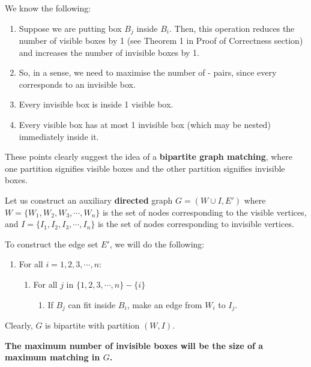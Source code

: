 \documentclass{article}
\begin{document}
We know the following:

\begin{enumerate}
    \item Suppose we are putting box $B_j$ inside $B_i$. Then, this operation reduces the number of visible boxes by 1 (see Theorem 1 in Proof of Correctness section) and increases the number of invisible boxes by 1.

    \item So, in a sense, we need to maximise the number of - pairs, since every  corresponds to an invisible box.

    \item Every invisible box is inside 1 visible box.

    \item Every visible box has at most 1 invisible box (which may be nested) immediately inside it.
\end{enumerate}

These points clearly suggest the idea of a \textbf{bipartite graph matching}, where one partition signifies visible boxes and the other partition signifies invisible boxes.

Let us construct an auxiliary \textbf{directed} graph $G = (W \cup I, E')$ where $W = \{W_1,W_2,W_3,\cdots,W_n\}$ is the set of nodes corresponding to the visible vertices, and $I = \{I_1, I_2, I_3, \cdots, I_n\}$ is the set of nodes corresponding to invisible vertices.

To construct the edge set $E'$, we will do the following:

\begin{enumerate}
    \item For all $i = 1,2,3, \cdots, n$:
        \begin{enumerate}
            \item For all $j$ in $\{ 1,2,3, \cdots, n \} - \{i\}$ 
                \begin{enumerate}
                    \item If $B_j$ can  fit inside $B_i$, make an edge from $W_i$ to $I_j$.
                \end{enumerate}
        \end{enumerate}
\end{enumerate}

Clearly, $G$ is bipartite with partition $(W, I)$.

\textbf{The maximum number of invisible boxes will be the size of a maximum matching in $G$.}
\end{document}
